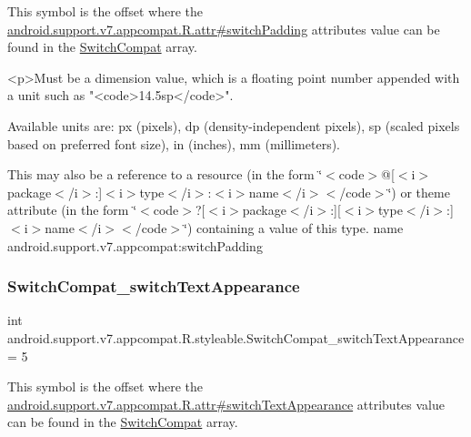 This symbol is the offset where the \hyperlink{classandroid_1_1support_1_1v7_1_1appcompat_1_1R_1_1attr_add600be9acdf3c047a7d45235678c4fb}{android.\+support.\+v7.\+appcompat.\+R.\+attr\#switch\+Padding} attribute\textquotesingle{}s value can be found in the \hyperlink{classandroid_1_1support_1_1v7_1_1appcompat_1_1R_1_1styleable_aabe688560752254f2288f3eaf9439737}{Switch\+Compat} array.

\begin{DoxyVerb}      <p>Must be a dimension value, which is a floating point number appended with a unit such as "<code>14.5sp</code>".
\end{DoxyVerb}
 Available units are\+: px (pixels), dp (density-\/independent pixels), sp (scaled pixels based on preferred font size), in (inches), mm (millimeters). 

This may also be a reference to a resource (in the form \char`\"{}$<$code$>$@\mbox{[}$<$i$>$package$<$/i$>$\+:\mbox{]}$<$i$>$type$<$/i$>$\+:$<$i$>$name$<$/i$>$$<$/code$>$\char`\"{}) or theme attribute (in the form \char`\"{}$<$code$>$?\mbox{[}$<$i$>$package$<$/i$>$\+:\mbox{]}\mbox{[}$<$i$>$type$<$/i$>$\+:\mbox{]}$<$i$>$name$<$/i$>$$<$/code$>$\char`\"{}) containing a value of this type.  name android.\+support.\+v7.\+appcompat\+:switch\+Padding \mbox{\label{classandroid_1_1support_1_1v7_1_1appcompat_1_1R_1_1styleable_accc91eca4539833e0ff7735849450846}} 
\subsubsection{\texorpdfstring{Switch\+Compat\+\_\+switch\+Text\+Appearance}{SwitchCompat\_switchTextAppearance}}
{\footnotesize\ttfamily int android.\+support.\+v7.\+appcompat.\+R.\+styleable.\+Switch\+Compat\+\_\+switch\+Text\+Appearance = 5\hspace{0.3cm}{\ttfamily [static]}}

This symbol is the offset where the \hyperlink{classandroid_1_1support_1_1v7_1_1appcompat_1_1R_1_1attr_a916b122ead6607d761f230b3b85f3f71}{android.\+support.\+v7.\+appcompat.\+R.\+attr\#switch\+Text\+Appearance} attribute\textquotesingle{}s value can be found in the \hyperlink{classandroid_1_1support_1_1v7_1_1appcompat_1_1R_1_1styleable_aabe688560752254f2288f3eaf9439737}{Switch\+Compat} array.

